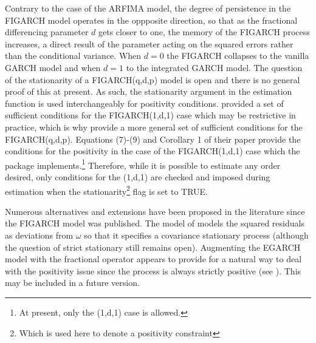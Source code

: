 Contrary to the case of the ARFIMA model, the degree of persistence in the FIGARCH model operates in the oppposite direction, so that as the fractional differencing parameter $d$ gets closer to one, the memory of the FIGARCH process increases, a direct result of the parameter acting on the squared errors rather than the conditional variance. When $d=0$ the FIGARCH collapses to the vanilla GARCH model and when $d=1$ to the integrated GARCH model. The question of the stationarity of a FIGARCH(q,d,p) model is open and there is no general proof of this at present. As such, the stationarity argument in the estimation function is used interchangeably for positivity conditions. \cite{Baillie1996} provided a set of sufficient conditions for the FIGARCH(1,d,1) case which may be restrictive in practice, which is why \cite{Conrad2006} provide a more general set of sufficient conditions for the FIGARCH(q,d,p). Equations (7)-(9) and Corollary 1 of their paper provide the conditions for the positivity in the case of the FIGARCH(1,d,1) case which the \verb@rugarch@ package implements.\footnote{At present, only the (1,d,1) case is allowed.} Therefore, while it is possible to estimate any order desired, only conditions for the (1,d,1) are checked and imposed during estimation when the stationarity\footnote{Which is used here to denote a positivity constraint} flag is set to TRUE.


Numerous alternatives and extensions have been proposed in the literature since the FIGARCH model was published. The model of \cite{Karanasos2004} models the squared residuals as deviations from $\omega$ so that it specifies a covariance stationary process (although the question of strict stationary still remains open). Augmenting the EGARCH model with the fractional operator appears to provide for a natural way to deal with the positivity issue since the process is always strictly positive (see \cite{Bollerslev1996b}). This may be included in a future version.




